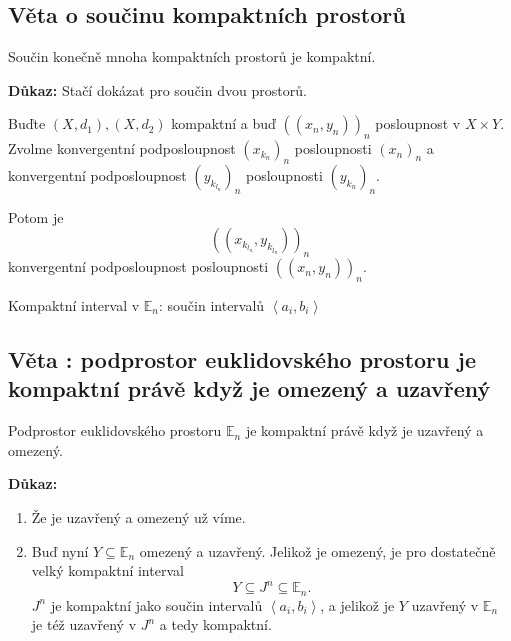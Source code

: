 \documentclass[10pt]{article}
\begin{document}
\subsection{Věta o součinu kompaktních prostorů}
\hspace{1.2mm}
\noindent
Součin konečně mnoha kompaktních prostorů je kompaktní.

\vspace{5mm}
\noindent
\textbf{Důkaz:} Stačí dokázat pro součin dvou prostorů.

Buďte $(X,d_1), (X, d_2)$ kompaktní a buď $((x_n,y_n))_n$ posloupnost v $X \times Y$. 
Zvolme konvergentní podposloupnost $(x_{k_n})_n$ posloupnosti $(x_n)_n$ a konvergentní podposloupnost $(y_{k_{l_n}})_n$ posloupnosti $(y_{k_n})_n$.

Potom je 
\[((x_{k_{l_n}},y_{k_{l_n}}))_n\]
konvergentní podposloupnost posloupnosti $((x_n,y_n))_n$.

\begin{center}
    Kompaktní interval v $\mathbb{E}_n$: součin intervalů $\left<a_i,b_i\right>$
\end{center}

\newpage
\subsection{Věta : podprostor euklidovského prostoru je kompaktní právě když je omezený a uzavřený}
\hspace{1.2mm}
\noindent
Podprostor euklidovského prostoru $\mathbb{E}_n$ je kompaktní právě když je uzavřený a omezený.

\vspace{5mm}
\noindent
\textbf{Důkaz:} 
\begin{enumerate}
    \item Že je uzavřený a omezený už víme.
    \item Buď nyní $Y \subseteq \mathbb{E}_n$ omezený a uzavřený. Jelikož je omezený, je pro dostatečně velký kompaktní interval
    \[Y \subseteq J^n \subseteq \mathbb{E}_n.\]
    $J^n$ je kompaktní jako součin intervalů $\left<a_i,b_i\right>$, a jelikož je $Y$ uzavřený v $\mathbb{E}_n$ je též uzavřený
    v $J^n$ a tedy kompaktní.
\end{enumerate}

\end{document}
